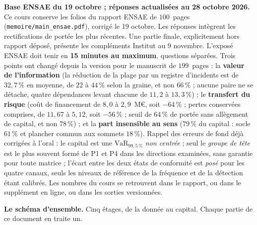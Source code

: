 \smallskip
\noindent\textcolor{accent}{\textbf{Base ENSAE du 19 octobre ; réponses actualisées au 28 octobre 2026.}}
Ce cours conserve les folios du rapport ENSAE de $100$~pages (\texttt{memoire/main\_ensae.pdf}),
corrigé le 19 octobre. Les réponses intègrent les rectifications de portée les plus récentes.
Une partie finale, explicitement hors rapport déposé, présente les compléments Institut au 9 novembre.
L'exposé ENSAE doit tenir en \textbf{15 minutes au maximum}, questions séparées. Trois points ont changé depuis la version pour le manuscrit de $199$~pages :
la \textbf{valeur de l'information} (la réduction de la plage par un registre d'incidents est de
$32{,}7\,\%$ en moyenne, de $22$ à $44\,\%$ selon la graine, et non $66\,\%$ ; aucune paire ne se
détache, quatre dépendances levant chacune de $11{,}2$ à $13{,}3\,\%$) ; le \textbf{transfert du
risque} (coût de financement de $8{,}0$ à $2{,}9$~M\euro, soit $-64\,\%$ ; pertes conservées
comprises, de $11{,}67$ à $5{,}12$, soit $-56\,\%$ ; seuil de $64\,\%$ de portée sans allègement de
capital, et non $78\,\%$) ; et la \textbf{part insensible au sens} ($79\,\%$ du capital : socle
$61\,\%$ et plancher commun aux sommets $18\,\%$). Rappel des erreurs de fond déjà corrigées à
l'oral : le capital est une $\mathrm{VaR}_{99{,}5\,\%}$ \emph{non centrée} ; seul le \emph{groupe de
tête} est le plus souvent formé de P1 et P4 dans les directions examinées, sans garantie pour toute matrice ; l'écart entre les deux états de conformité
est \emph{posé} pour les quatre canaux, seuls les niveaux de référence de la fréquence et de la
détection étant calibrés. Les nombres du cours se retrouvent dans le rapport, ou dans le supplément
en ligne, ou dans les sorties versionnées.

\bigskip
\noindent\textbf{Le schéma d'ensemble.} Cinq étages, de la donnée au capital. Chaque partie de ce
document en traite un.


